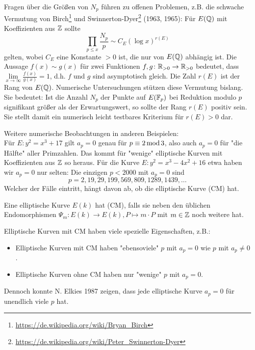 \begin{bem}
	Fragen über die Größen von $N_p$ führen zu offenen Problemen, z.B. die schwache Vermutung von Birch\footnote{\url{https://de.wikipedia.org/wiki/Bryan_Birch}} und Swinnerton-Dyer\footnote{\url{https://de.wikipedia.org/wiki/Peter_Swinnerton-Dyer}} (1963, 1965):
	Für $E(\mathbb{Q})$ mit Koeffizienten aus $\mathbb{Z}$ sollte
	\[
		\prod_{p \leq x} \frac{N_p}{p} \sim C_E(\log x)^{r(E)}
	\]
	gelten, wobei $C_E$ eine Konstante $> 0$ ist, die nur von $E(\mathbb{Q})$ abhängig ist.
	Die Aussage $f(x) \sim g(x)$ für zwei Funktionen $f,g\colon \mathbb{R}_{>0} \rightarrow \mathbb{R}_{>0}$ bedeutet, dass $\lim\limits_{x \rightarrow \infty} \frac{f(x)}{g(x)}=1$, d.h. $f$ und $g$ sind asymptotisch gleich.
	Die Zahl $r(E)$ ist der Rang von $E(\mathbb{Q})$.
	Numerische Untersuchungen stützen diese Vermutung bislang.
	Sie bedeutet:
	Ist die Anzahl $N_p$ der Punkte auf $E(\mathbb{F}_p)$ bei Reduktion modulo $p$ signifikant größer als der Erwartungswert, so sollte der Rang $r(E)$ positiv sein.
	Sie stellt damit ein numerisch leicht testbares Kriterium für $r(E) > 0$ dar.
\end{bem}

\begin{bsp}
	Weitere numerische Beobachtungen in anderen Beispielen: \\
	Für $E \colon y^2 = x^3 + 17$ gilt $a_p = 0$ genau für $p \equiv 2 \operatorname{mod} 3$, also auch $a_p = 0$ für "die Hälfte" aller Primzahlen.
	Das kommt für "wenige" elliptische Kurven mit Koeffizienten aus $\mathbb{Z}$ so heraus.
	Für die Kurve $E \colon y^2 = x^3 - 4x^2 + 16$ etwa haben wir $a_p=0$ nur selten:
	Die einzigen $p < 2000$ mit $a_p = 0$ sind
	\[
		p = 2, 19, 29, 199, 569, 809, 1289, 1439, \dots
	\]
	Welcher der Fälle eintritt, hängt davon ab, ob die elliptische Kurve  (CM) hat.
\end{bsp}

\begin{defn}
	Eine elliptische Kurve $E(k)$ hat  (CM), falls sie neben den üblichen Endomorphismen $\Psi_m \colon E(k) \rightarrow E(k), P \mapsto m \cdot P$ mit $m \in \mathbb{Z}$ noch weitere hat.
\end{defn}

Elliptische Kurven mit CM haben viele spezielle Eigenschaften, z.B.:
\begin{itemize}
	\item Elliptische Kurven mit CM haben "ebensoviele" $p$ mit $a_p = 0$ wie $p$ mit $a_p \neq 0$.
	\item Elliptische Kurven ohne CM haben nur "wenige" $p$ mit $a_p = 0$.
\end{itemize}
Dennoch konnte N. Elkies 1987 zeigen, dass jede elliptische Kurve $a_p=0$ für unendlich viele $p$ hat.

